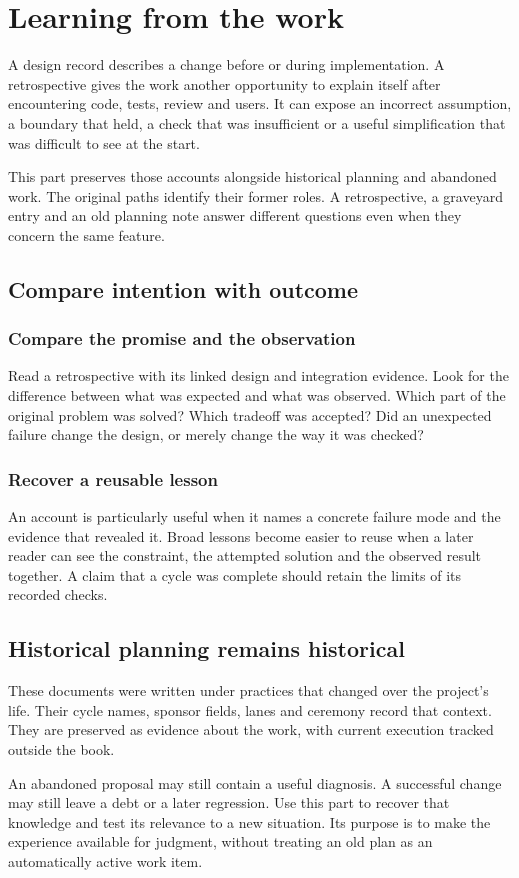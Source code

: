 \chapter*{Learning from the work}

A design record describes a change before or during implementation. A retrospective gives the work another opportunity to explain itself after encountering code, tests, review and users. It can expose an incorrect assumption, a boundary that held, a check that was insufficient or a useful simplification that was difficult to see at the start.

This part preserves those accounts alongside historical planning and abandoned work. The original paths identify their former roles. A retrospective, a graveyard entry and an old planning note answer different questions even when they concern the same feature.

\section*{Compare intention with outcome}

\subsection*{Compare the promise and the observation}

Read a retrospective with its linked design and integration evidence. Look for the difference between what was expected and what was observed. Which part of the original problem was solved? Which tradeoff was accepted? Did an unexpected failure change the design, or merely change the way it was checked?

\subsection*{Recover a reusable lesson}

An account is particularly useful when it names a concrete failure mode and the evidence that revealed it. Broad lessons become easier to reuse when a later reader can see the constraint, the attempted solution and the observed result together. A claim that a cycle was complete should retain the limits of its recorded checks.

\section*{Historical planning remains historical}

These documents were written under practices that changed over the project's life. Their cycle names, sponsor fields, lanes and ceremony record that context. They are preserved as evidence about the work, with current execution tracked outside the book.

An abandoned proposal may still contain a useful diagnosis. A successful change may still leave a debt or a later regression. Use this part to recover that knowledge and test its relevance to a new situation. Its purpose is to make the experience available for judgment, without treating an old plan as an automatically active work item.
